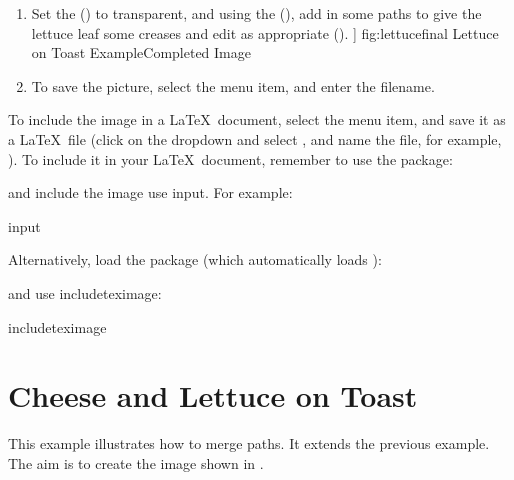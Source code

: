 \begin{enumerate}
{}
{Lettuce on Toast Example\dash Adding a Closed Curve Path}
[
  \item Set the  () to
  \gls{transparent}, and using the 
  (), add in some \glspl{path} to give
  the lettuce leaf some creases and edit as appropriate
  ().
]
{fig:lettucefinal}
{}
{Lettuce on Toast Example\dash Completed Image}

\item To save the picture, select the 
menu item, and enter the filename.

\end{enumerate}

To include the image in a \LaTeX\ document, select the
 menu item, and save it as a
\LaTeX\ file (click on the  \gls{dropdown} and
select , and name the file,
for example, ).
To include it in your \LaTeX\ document, remember to use the
 package:
\begin{codebox}
\end{codebox}
and include the image use \gls{input}. For example:
\begin{codebox}
\gls{input}
\end{codebox}
Alternatively, load the  package (which
automatically loads ):
\begin{codebox}
\end{codebox}
and use \gls{includeteximage}:
\begin{codebox}
\gls{includeteximage}
\end{codebox}

\section{Cheese and Lettuce on Toast}\label{sec:cheeseexample}

This example illustrates how to merge paths. It extends the
previous  example.
The aim is to create the image shown in .

